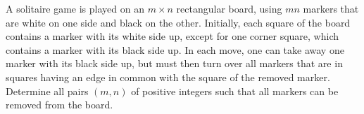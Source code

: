 A solitaire game is played on an $m \times n$ rectangular board, using $mn$ markers that are white on one side and black on the other. Initially, each square of the board contains a marker with its white side up, except for one corner square, which contains a marker with its black side up. In each move, one can take away one marker with its black side up, but must then turn over all markers that are in squares having an edge in common with the square of the removed marker. Determine all pairs $(m, n)$ of positive integers such that all markers can be removed from the board.
